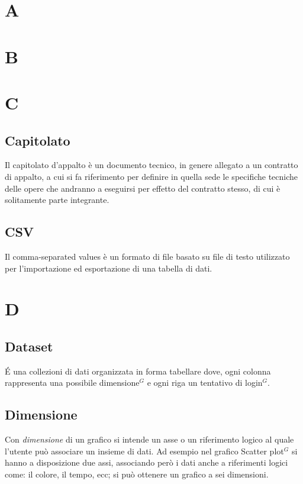 \section{A}

\newpage
\section{B}

\newpage
\section{C}
\subsection{Capitolato}
Il capitolato d'appalto è un documento tecnico, in genere allegato a un contratto di appalto, a cui si fa riferimento per definire in quella sede le specifiche tecniche delle opere che andranno a eseguirsi per effetto del contratto stesso, di cui è solitamente parte integrante.

\subsection{CSV}
Il comma-separated values è un formato di file basato su file di testo utilizzato per l'importazione ed esportazione di una tabella di dati.

\newpage
\section{D}
\subsection{Dataset}
\'E una collezioni di dati organizzata in forma tabellare dove, ogni colonna rappresenta una possibile dimensione$^{G}$ e ogni riga un tentativo di login$^{G}$.

\subsection{Dimensione}
Con \textit{dimensione} di un grafico si intende un asse o un riferimento logico al quale l'utente può associare un insieme di dati. Ad esempio nel grafico Scatter plot$^{G}$ si hanno a disposizione due assi, associando però i dati anche a riferimenti logici come: il colore, il tempo, ecc; si può ottenere un grafico a sei dimensioni. 


